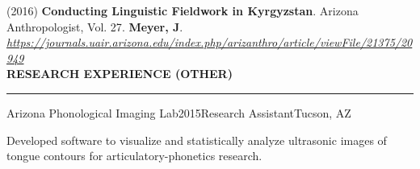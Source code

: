 \documentclass{resume} %
\begin{document}
{(2016)}
{\bf Conducting Linguistic Fieldwork in Kyrgyzstan}.
       {Arizona Anthropologist, Vol. 27}.
       {\textbf{Meyer, J}}.
       \emph{\url{https://journals.uair.arizona.edu/index.php/arizanthro/article/viewFile/21375/20949}}
       \\
  



\vspace{.25cm}
\sectionskip
\MakeUppercase{\textbf{Research Experience (Other)}}
  \sectionlineskip
  \hrule
\vspace{.5cm}




\begin{rSubsection}{Arizona Phonological Imaging Lab}{2015}{Research Assistant}{Tucson, AZ}
\item Developed software to visualize and statistically analyze ultrasonic images of tongue contours for articulatory-phonetics research.
\end{rSubsection}
\end{document}
